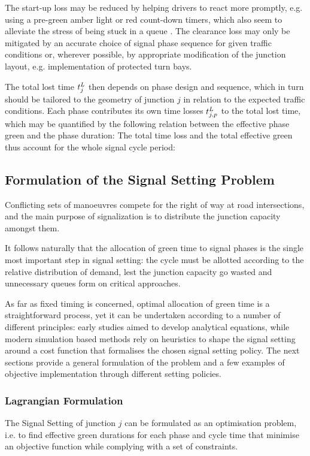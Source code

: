 The start-up loss may be reduced by helping drivers to react more promptly, e.g. using a pre-green amber light or red count-down timers, which also seem to alleviate the stress of being stuck in a queue .
The clearance loss may only be mitigated by an accurate choice of signal phase sequence for given traffic conditions or, wherever possible, by appropriate modification of the junction layout, e.g. implementation of protected turn bays.

The total lost time $t_{j}^L$ then depends on phase design and sequence, which in turn should
be tailored to the geometry of junction $j$ in relation to the expected traffic conditions.
Each phase contributes its own time losses $t_{j,p}^L$ to the total lost time, which may be
quantified by the following relation between the effective phase green and the phase duration:
The total time loss and the total effective green thus account for the whole signal cycle period:


\subsection{Formulation of the Signal Setting Problem}
Conflicting sets of manoeuvres compete for the right of way at road intersections, and the
main purpose of signalization is to distribute the junction capacity amongst them.

It follows naturally that the allocation of green time to signal phases is the single most important step in signal setting: the cycle must be allotted according to the relative distribution of demand,
lest the junction capacity go wasted and unnecessary queues form on critical approaches.

As far as fixed timing is concerned, optimal allocation of green time is a straightforward
process, yet it can be undertaken according to a number of different principles: early studies
aimed to develop analytical equations, while modern simulation based methods rely on
heuristics to shape the signal setting around a cost function that formalises the chosen signal
setting policy. The next sections provide a general formulation of the problem and a few examples of objective implementation through different setting policies.

\subsubsection*{Lagrangian Formulation}
\newcommand{\grenvec}{\vec{\gren{}}_{\phaset_j}}
The Signal Setting of junction $j$ can be formulated as an optimisation problem, i.e. to find
effective green durations for each phase and cycle time that minimise an objective function while complying with a set of constraints.

